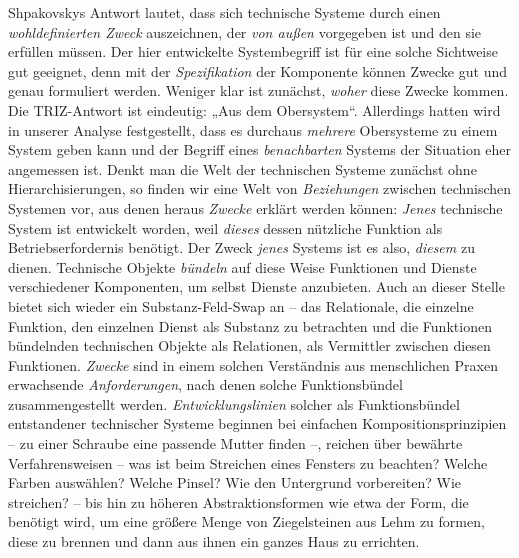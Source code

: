 \documentclass[11pt,a4paper]{article}
\begin{document}
Shpakovskys Antwort lautet, dass sich technische Systeme durch einen
\emph{wohldefinierten Zweck} auszeichnen, der \emph{von außen} vorgegeben ist
und den sie erfüllen müssen.  Der hier entwickelte Systembegriff ist für eine
solche Sichtweise gut geeignet, denn mit der \emph{Spezifikation} der
Komponente können Zwecke gut und genau formuliert werden. Weniger klar ist
zunächst, \emph{woher} diese Zwecke kommen.  Die TRIZ-Antwort ist eindeutig:
„Aus dem Obersystem“. Allerdings hatten wird in unserer Analyse festgestellt,
dass es durchaus \emph{mehrere} Obersysteme zu einem System geben kann und der
Begriff eines \emph{benachbarten} Systems der Situation eher angemessen ist.
Denkt man die Welt der technischen Systeme zunächst ohne Hierarchisierungen,
so finden wir eine Welt von \emph{Beziehungen} zwischen technischen Systemen
vor, aus denen heraus \emph{Zwecke} erklärt werden können: \emph{Jenes}
technische System ist entwickelt worden, weil \emph{dieses} dessen nützliche
Funktion als Betriebserfordernis benötigt. Der Zweck \emph{jenes} Systems ist
es also, \emph{diesem} zu dienen.  Technische Objekte \emph{bündeln} auf diese
Weise Funktionen und Dienste verschiedener Komponenten, um selbst Dienste
anzubieten.  Auch an dieser Stelle bietet sich wieder ein Substanz-Feld-Swap
an -- das Relationale, die einzelne Funktion, den einzelnen Dienst als
Substanz zu betrachten und die Funktionen bündelnden technischen Objekte als
Relationen, als Vermittler zwischen diesen Funktionen.  \emph{Zwecke} sind in
einem solchen Verständnis aus menschlichen Praxen erwachsende
\emph{Anforderungen}, nach denen solche Funktionsbündel zusammengestellt
werden.  \emph{Entwicklungslinien} solcher als Funktionsbündel entstandener
technischer Systeme beginnen bei einfachen Kompositionsprinzipien -- zu einer
Schraube eine passende Mutter finden --, reichen über bewährte
Verfahrensweisen -- was ist beim Streichen eines Fensters zu beachten? Welche
Farben auswählen? Welche Pinsel? Wie den Untergrund vorbereiten? Wie
streichen? -- bis hin zu höheren Abstraktionsformen wie etwa der Form, die
benötigt wird, um eine größere Menge von Ziegelsteinen aus Lehm zu formen,
diese zu brennen und dann aus ihnen ein ganzes Haus zu errichten.
\end{document}
